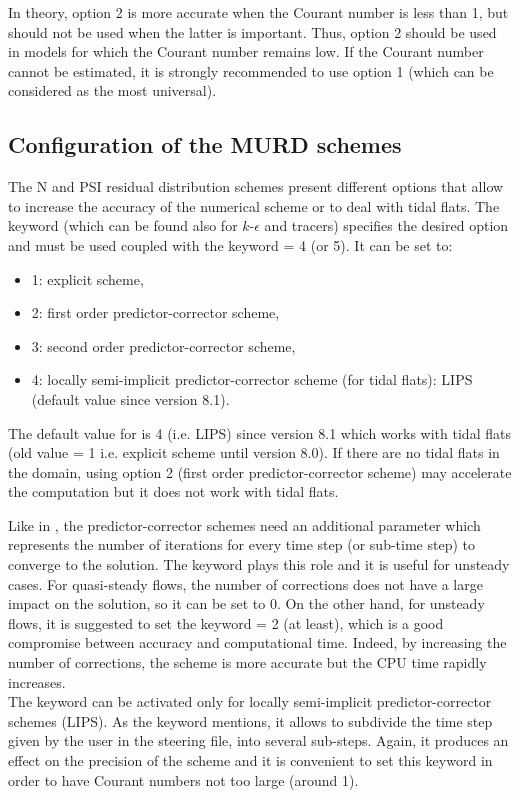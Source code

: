 In theory, option 2 is more accurate when the Courant number is less than 1,
but should not be used when the latter is important. Thus, option 2 should be
used in models for which the Courant number remains low. If the Courant number
cannot be estimated, it is strongly recommended to use option 1 (which can be
considered as the most universal).

\subsection{Configuration of the MURD schemes}
\label{sec:MURD}
The N and PSI residual distribution schemes present different options that allow
to increase the accuracy of the numerical scheme or to deal with tidal flats.
The keyword  (which can be
found also for $k$-$\epsilon$ and tracers) specifies the desired option and must
be used coupled with the keyword
= 4 (or 5).
It can be set to:
\begin{itemize}
 \item 1: explicit scheme,
 \item 2: first order predictor-corrector scheme,
 \item 3: second order predictor-corrector scheme,
 \item 4: locally semi-implicit predictor-corrector scheme
(for tidal flats): LIPS (default value since version 8.1).
\end{itemize}
The default value for  is
4 (i.e. LIPS) since version 8.1 which works with tidal flats (old value = 1
i.e. explicit scheme until version 8.0).
If there are no tidal flats in the domain, using option 2 (first order
predictor-corrector scheme) may accelerate the computation but it does not
work with tidal flats.

Like in , the predictor-corrector schemes need an additional
parameter which represents the number of iterations for every time step
(or sub-time step) to converge to the solution.
The keyword  plays this
role and it is useful for unsteady cases.
For quasi-steady flows, the number of corrections does not have a large impact
on the solution, so it can be set to 0.
On the other hand, for unsteady flows, it is suggested to set the keyword
= 2 (at least),
which is a good compromise between accuracy and computational time.
Indeed, by increasing the number of corrections, the scheme is more accurate but
the CPU time rapidly increases.\\
The keyword  can be
activated only for locally semi-implicit predictor-corrector schemes (LIPS).
As the keyword mentions, it allows to subdivide the time step given by the user
in the steering file, into several sub-steps.
Again, it produces an effect on the precision of the scheme and it is convenient
to set this keyword in order to have Courant numbers not too large (around 1).

